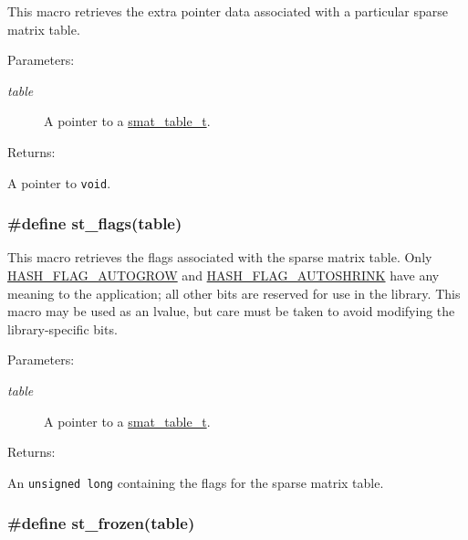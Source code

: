 This macro retrieves the extra pointer data associated with a particular sparse matrix table.\begin{Desc}
\item[Parameters: ]\par
\begin{description}
\item[{\em 
table}]A pointer to a \hyperlink{group__dbprim__smat_a0}{smat\_\-table\_\-t}.\end{description}
\end{Desc}
\begin{Desc}
\item[Returns: ]\par
A pointer to {\tt void}. \end{Desc}
\hypertarget{group__dbprim__smat_a22}{
\subsubsection[st\_\-flags]{\setlength{\rightskip}{0pt plus 5cm}\#define st\_\-flags(table)}}
\label{group__dbprim__smat_a22}


This macro retrieves the flags associated with the sparse matrix table. Only \hyperlink{group__dbprim__hash_a16}{HASH\_\-FLAG\_\-AUTOGROW} and \hyperlink{group__dbprim__hash_a17}{HASH\_\-FLAG\_\-AUTOSHRINK} have any meaning to the application; all other bits are reserved for use in the library. This macro may be used as an lvalue, but care must be taken to avoid modifying the library-specific bits.\begin{Desc}
\item[Parameters: ]\par
\begin{description}
\item[{\em 
table}]A pointer to a \hyperlink{group__dbprim__smat_a0}{smat\_\-table\_\-t}.\end{description}
\end{Desc}
\begin{Desc}
\item[Returns: ]\par
An {\tt unsigned long} containing the flags for the sparse matrix table. \end{Desc}
\hypertarget{group__dbprim__smat_a23}{
\subsubsection[st\_\-frozen]{\setlength{\rightskip}{0pt plus 5cm}\#define st\_\-frozen(table)}}
\label{group__dbprim__smat_a23}


